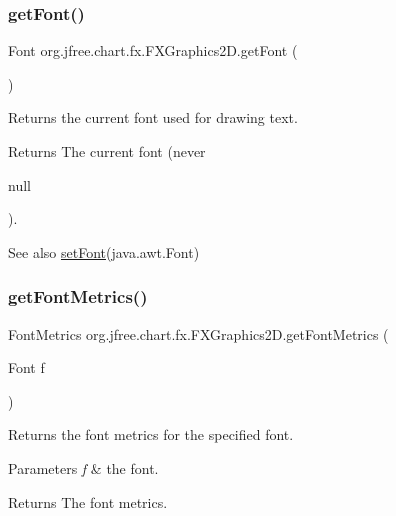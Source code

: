 \subsubsection{\texorpdfstring{get\+Font()}{getFont()}}
{\footnotesize\ttfamily Font org.\+jfree.\+chart.\+fx.\+F\+X\+Graphics2\+D.\+get\+Font (\begin{DoxyParamCaption}{ }\end{DoxyParamCaption})}

Returns the current font used for drawing text.

\begin{DoxyReturn}{Returns}
The current font (never
\begin{DoxyCode}
null 
\end{DoxyCode}
 ).
\end{DoxyReturn}
\begin{DoxySeeAlso}{See also}
\mbox{\hyperlink{classorg_1_1jfree_1_1chart_1_1fx_1_1_f_x_graphics2_d_a20e1506df8646706b0b404e9a6b1423f}{set\+Font}}(java.\+awt.\+Font) 
\end{DoxySeeAlso}
\mbox{\label{classorg_1_1jfree_1_1chart_1_1fx_1_1_f_x_graphics2_d_a59cf49af7fa02e82c05cb2f76d4ed0b5}} 
\subsubsection{\texorpdfstring{get\+Font\+Metrics()}{getFontMetrics()}}
{\footnotesize\ttfamily Font\+Metrics org.\+jfree.\+chart.\+fx.\+F\+X\+Graphics2\+D.\+get\+Font\+Metrics (\begin{DoxyParamCaption}\item[{Font}]{f }\end{DoxyParamCaption})}

Returns the font metrics for the specified font.


\begin{DoxyParams}{Parameters}
{\em f} & the font.\\
\hline
\end{DoxyParams}
\begin{DoxyReturn}{Returns}
The font metrics. 
\end{DoxyReturn}
\mbox{\label{classorg_1_1jfree_1_1chart_1_1fx_1_1_f_x_graphics2_d_a6fa99057b015d895c6f26e3177dbb94e}} 

